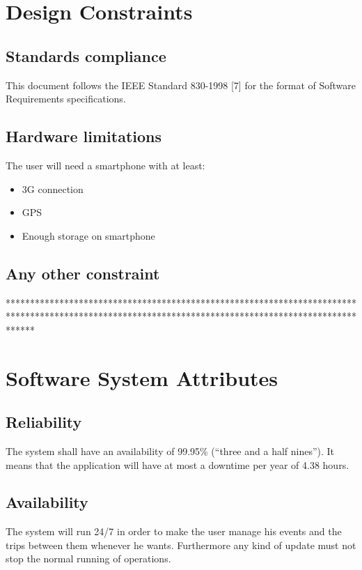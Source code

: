 \section{Design Constraints}
%
\subsection{Standards compliance}
This document follows the IEEE Standard 830-1998 [7] for the format of Software Requirements specifications.
%
\subsection{Hardware limitations}
The user will need a smartphone with at least:
\begin{itemize}
\item 3G connection
\item GPS
\item Enough storage on smartphone
\end{itemize}
%
\subsection{Any other constraint}
******************************************************************************************************************************************************
%
\section{Software System Attributes}
%
\subsection{Reliability}
The system shall have an availability of 99.95\% (“three and a half nines”). It means that the application will have at most a downtime per year of 4.38 hours.
%
\subsection{Availability}
The system will run 24/7 in order to make the user manage his events and the trips between them whenever he wants. Furthermore any kind of update must not stop the normal running of operations.
%
